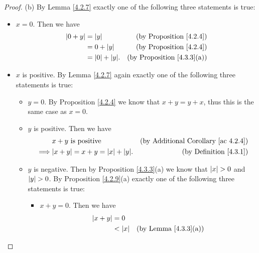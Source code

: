 \begin{proof}{(b)}
    By Lemma \ref{4.2.7} exactly one of the following three statements is true:
    \begin{itemize}
        \item \(x = 0\).
              Then we have
              \begin{align*}
                  \abs*{0 + y} & = \abs*{y}             & \text{(by Proposition \ref{4.2.4})}    \\
                               & = 0 + \abs*{y}         & \text{(by Proposition \ref{4.2.4})}    \\
                               & = \abs*{0} + \abs*{y}. & \text{(by Proposition \ref{4.3.3}(a))}
              \end{align*}
        \item \(x\) is positive.
              By Lemma \ref{4.2.7} again exactly one of the following three statements is true:
              \begin{itemize}
                  \item \(y = 0\).
                        By Proposition \ref{4.2.4} we know that \(x + y = y + x\), thus this is the same case as \(x = 0\).
                  \item \(y\) is positive.
                        Then we have
                        \begin{align*}
                                     & x + y \text{ is positive}                   & \text{(by Additional Corollary \ref{ac 4.2.4})} \\
                            \implies & \abs*{x + y} = x + y = \abs*{x} + \abs*{y}. & \text{(by Definition \ref{4.3.1})}
                        \end{align*}
                  \item \(y\) is negative.
                        Then by Proposition \ref{4.3.3}(a) we know that \(\abs*{x} > 0\) and \(\abs*{y} > 0\).
                        By Proposition \ref{4.2.9}(a) exactly one of the following three statements is true:
                        \begin{itemize}
                            \item \(x + y = 0\).
                                  Then we have
                                  \begin{align*}
                                      \abs*{x + y} & = 0                                                             \\
                                                   & < \abs*{x}             & \text{(by Lemma \ref{4.3.3}(a))}       \\

\end{align*}
\end{itemize}
\end{itemize}
\end{itemize}
\end{proof}
